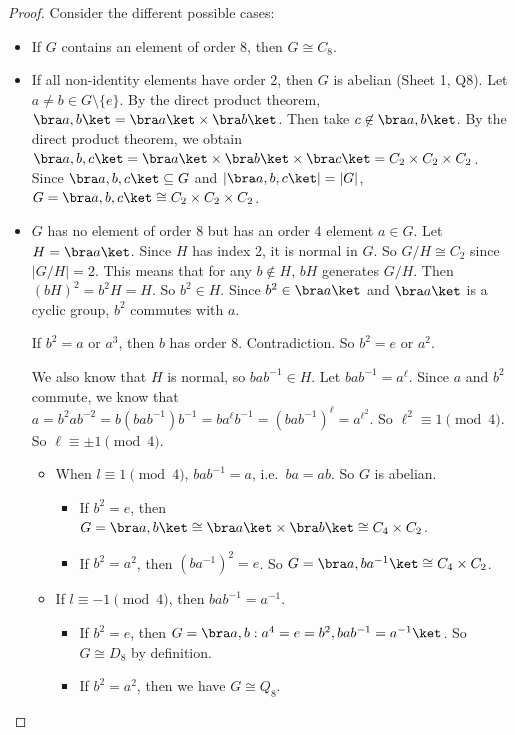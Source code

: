 \documentclass[a4paper]{article}
\begin{document}
\begin{proof}
  Consider the different possible cases:
  \begin{itemize}
    \item If $G$ contains an element of order 8, then $G\cong C_8$.
    \item If all non-identity elements have order 2, then $G$ is abelian (Sheet 1, Q8). Let $a\not= b\in G\setminus\{e\}$. By the direct product theorem, $\bra a, b\ket = \bra a\ket\times\bra b\ket$. Then take $c\not\in \bra a, b\ket$. By the direct product theorem, we obtain $\bra a, b, c\ket = \bra a\ket\times\bra b\ket\times\bra c\ket = C_2\times C_2\times C_2$. Since $\bra a, b, c\ket\subseteq G$ and $|\bra a, b, c\ket| = |G|$, $G = \bra a, b, c\ket \cong C_2\times C_2\times C_2$.
    \item $G$ has no element of order 8 but has an order 4 element $a\in G$. Let $H = \bra a\ket$. Since $H$ has index 2, it is normal in $G$. So $G/H \cong C_2$ since $|G/H| = 2$. This means that for any $b\not\in H$, $bH$ generates $G/H$. Then $(bH)^2 = b^2H = H$. So $b^2\in H$. Since $b^2\in \bra a\ket$ and $\bra a\ket$ is a cyclic group, $b^2$ commutes with $a$.

      If $b^2 = a$ or $a^3$, then $b$ has order 8. Contradiction. So $b^2 = e$ or $a^2$.

      We also know that $H$ is normal, so $bab^{-1}\in H$. Let $bab^{-1} = a^\ell$. Since $a$ and $b^2$ commute, we know that $a = b^2 ab^{-2} = b(bab^{-1})b^{-1} = ba^\ell b^{-1} = (bab^{-1})^{\ell} = a^{\ell^2}$. So $\ell^2 \equiv 1\pmod 4$. So $\ell \equiv \pm 1 \pmod 4$.

      \begin{itemize}
        \item When $l\equiv 1\pmod 4$, $bab^{-1} = a$, i.e.\ $ba = ab$. So $G$ is abelian.
          \begin{itemize}
            \item If $b^2 = e$, then $G = \bra a, b\ket \cong \bra a\ket \times \bra b\ket \cong C_4\times C_2$.
            \item If $b^2 = a^2$, then $(ba^{-1})^2 = e$. So $G = \bra a, ba^{-1}\ket \cong C_4\times C_2$.
          \end{itemize}
        \item If $l \equiv -1\pmod 4$, then $bab^{-1} = a^{-1}$.
          \begin{itemize}
            \item If $b^2 = e$, then $G = \bra a, b: a^4 = e = b^2, bab^{-1} = a^{-1}\ket$. So $G\cong D_8$ by definition.
            \item If $b^2 = a^2$, then we have $G\cong Q_8$.\qedhere
          \end{itemize}
      \end{itemize}%
  \end{itemize}
\end{proof}
\end{document}
